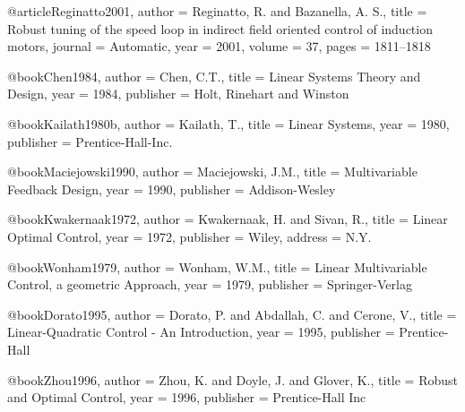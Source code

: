 @article{Reginatto2001,
  author = {Reginatto, R. and Bazanella, A. S.},
  title = {Robust tuning of the speed loop in indirect field oriented control of induction motors},
  journal = {Automatic},
  year = {2001},
  volume = {37},
  pages = {1811--1818}
}

%

@book{Chen1984,
  author = {Chen, C.T.},
  title = {Linear Systems Theory and Design},
  year = {1984},
  publisher = {Holt, Rinehart and Winston}
}

@book{Kailath1980b,
  author = {Kailath, T.},
  title = {Linear Systems},
  year = {1980},
  publisher = {Prentice-Hall-Inc.}
}

@book{Maciejowski1990,
  author = {Maciejowski, J.M.},
  title = {Multivariable Feedback Design},
  year = {1990},
  publisher = {Addison-Wesley}
}

@book{Kwakernaak1972,
  author = {Kwakernaak, H. and Sivan, R.},
  title = {Linear Optimal Control},
  year = {1972},
  publisher = {Wiley},
  address = {N.Y.}
}

@book{Wonham1979,
  author = {Wonham, W.M.},
  title = {Linear Multivariable Control, a geometric Approach},
  year = {1979},
  publisher = {Springer-Verlag}
}

@book{Dorato1995,
  author = {Dorato, P. and Abdallah, C. and Cerone, V.},
  title = {Linear-Quadratic Control - An Introduction},
  year = {1995},
  publisher = {Prentice-Hall}
}

@book{Zhou1996,
  author = {Zhou, K. and Doyle, J. and Glover, K.},
  title = {Robust and Optimal Control},
  year = {1996},
  publisher = {Prentice-Hall Inc}
}

%
